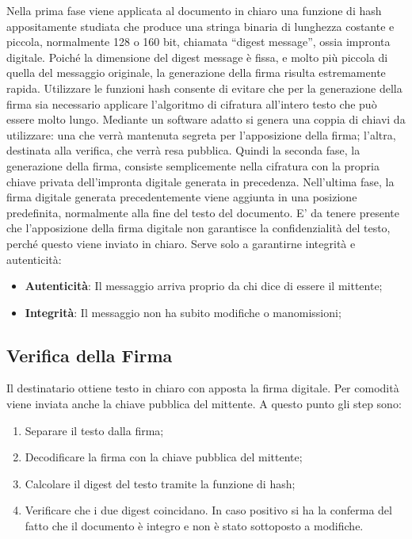 Nella prima fase viene applicata al documento in
chiaro una funzione di hash appositamente
studiata che produce una stringa binaria di
lunghezza costante e piccola, normalmente 128 o 160
bit, chiamata “digest message”, ossia impronta
digitale.
Poiché la dimensione del digest message è fissa,
e molto più piccola di quella del messaggio
originale, la generazione della firma risulta
estremamente rapida. Utilizzare le funzioni hash
consente di evitare che per la generazione della
firma sia necessario applicare l'algoritmo di
cifratura all'intero testo che può essere molto lungo.
Mediante un software adatto si genera una coppia di
chiavi da utilizzare: una che verrà mantenuta
segreta per l'apposizione della firma; l'altra, destinata alla verifica, che
verrà resa pubblica. Quindi
la seconda fase, la generazione della firma, consiste semplicemente nella
cifratura con la propria
chiave privata dell'impronta digitale generata in precedenza.
Nell'ultima fase, la firma digitale generata precedentemente viene aggiunta in
una posizione
predefinita, normalmente alla fine del testo del documento.
E' da tenere presente che l'apposizione della firma digitale non garantisce la
confidenzialità del
testo, perché questo viene inviato in chiaro. Serve solo a garantirne integrità
e autenticità:

\begin{itemize}
    \item \textbf{Autenticità}: Il messaggio arriva proprio da chi dice di essere il mittente;
    \item \textbf{Integrità}: Il messaggio non ha subito modifiche o manomissioni;
\end{itemize}

\subsection{Verifica della Firma}

Il destinatario ottiene testo in chiaro con apposta la firma digitale.
Per comodità viene inviata anche la chiave pubblica del mittente. A
questo punto gli step sono:

\begin{enumerate}
    \item Separare il testo dalla firma;
    \item Decodificare la firma con la chiave pubblica del mittente;
    \item Calcolare il digest del testo tramite la funzione di hash;
    \item Verificare che i due digest coincidano. In caso positivo si ha
          la conferma del fatto che il documento è integro e non è stato
          sottoposto a modifiche.
\end{enumerate}